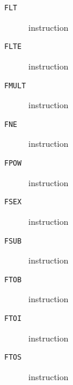 \clearpage
\begin{description}
\item[\texttt{FLT}] instruction\\

\end{description}
\clearpage
\begin{description}
\item[\texttt{FLTE}] instruction\\

\end{description}
\clearpage
\begin{description}
\item[\texttt{FMULT}] instruction\\

\end{description}
\clearpage
\begin{description}
\item[\texttt{FNE}] instruction\\

\end{description}
\clearpage
\begin{description}
\item[\texttt{FPOW}] instruction\\

\end{description}
\clearpage
\begin{description}
\item[\texttt{FSEX}] instruction\\

\end{description}
\clearpage
\begin{description}
\item[\texttt{FSUB}] instruction\\

\end{description}
\clearpage
\begin{description}
\item[\texttt{FTOB}] instruction\\

\end{description}
\clearpage
\begin{description}
\item[\texttt{FTOI}] instruction\\

\end{description}
\clearpage
\begin{description}
\item[\texttt{FTOS}] instruction\\

\end{description}
